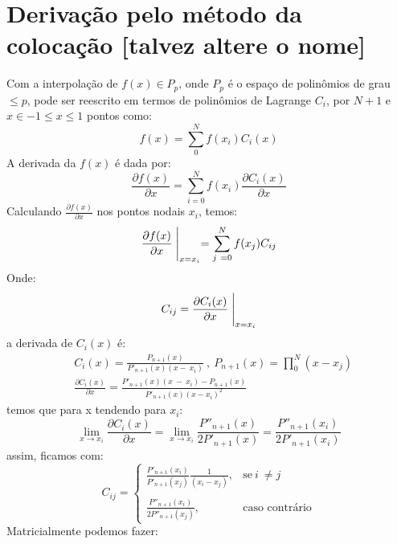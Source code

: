 \section{Derivação pelo método da colocação [talvez altere o nome] }
 Com a interpolação de $f(x) \in P_p$, onde $P_p$ é o espaço de polinômios de grau $\leq p$, pode ser reescrito em termos de polinômios de Lagrange $C_i$, por $N + 1$ e $x \in -1 \leq x \leq 1$ pontos como:
 \begin{equation}
 f(x)  = \sum^{N}_{0} f(x_i) C_i(x)
 \end{equation}
 A derivada da $f(x)$ é dada por:
 \begin{equation}
 \frac{\partial f(x)}{\partial x} = \sum^{N}_{i = 0} f(x_i) \frac{\partial C_i(x)}{\partial x}
 \end{equation}
 Calculando $\frac{\partial f(x)}{\partial x}$ nos pontos nodais $x_i$, temos:
\begin{equation}
   \frac{\partial f(x)}{\partial x}  \Biggm\lvert_{x=x_i} = \sum^{N}_{j\ = 0} f(x_j) C_{ij}
\end{equation}
 Onde:
 \begin{equation}
  C_{ij} = \frac{\partial C_i(x)}{\partial x} \Biggm\lvert_{x=x_i}
 \end{equation}
 a derivada de $C_i(x)$ é:
 \begin{align}
 &C_i(x) = \frac{P_{n+1}(x)}{P'_{n+1}(x)(x -\ x_i)}\ ,\ P_{n+1}(x) = \prod^{N}_{0} (x - x_j)\\
 &\frac{\partial C_i(x)}{\partial x} =  \frac{P'_{n+1}(x)(x\ -\ x_i) - P_{n+1}(x)}{P'_{n+1}(x)(x - x_i)^2}\ 
 \end{align}
 temos que para x tendendo para $x_i$:
 \begin{equation}
 \lim_{x \rightarrow x_i}  \frac{\partial C_i(x)}{\partial x} =  \lim_{x \rightarrow x_i} \frac{P''_{n+1}(x)}{2P'_{n+1}(x)} = \frac{P''_{n+1}(x_i)}{2P'_{n+1}(x_i)}
 \end{equation}
 assim, ficamos com:
 \begin{equation}\label{eq:test}
 C_{ij}= 
\begin{cases}
    \frac{P'_{n+1}(x_i)}{P'_{n+1}(x_j)} \frac{1}{(x_i - x_j)},& \text{se}\ i\ \neq  j\\\\
    \frac{P''_{n+1}(x_i)}{2P''_{n+1}(x_j)},              & \text{caso contrário}
\end{cases}
 \end{equation}
 Matricialmente podemos fazer:
